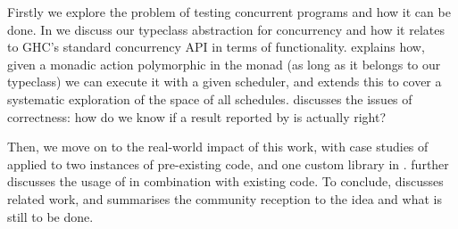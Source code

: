 Firstly we explore the problem of testing concurrent programs and how
it can be done. In \textbf{} we discuss our
typeclass abstraction for concurrency and how it relates to GHC's
standard concurrency API in terms of
functionality. \textbf{} explains how, given a monadic
action polymorphic in the monad (as long as it belongs to our
typeclass) we can execute it with a given scheduler, and
\textbf{} extends this to cover a systematic exploration of
the space of all schedules. \textbf{} discusses the
issues of correctness: how do we know if a result reported by
\dejafu{} is actually right?

Then, we move on to the real-world impact of this work, with case
studies of \dejafu{} applied to two instances of pre-existing code,
and one custom library in \textbf{}.
\textbf{} further discusses the usage of \dejafu{} in
combination with existing code. To conclude,
\textbf{} discusses related work, and summarises the
community reception to the idea and what is still to be done.
